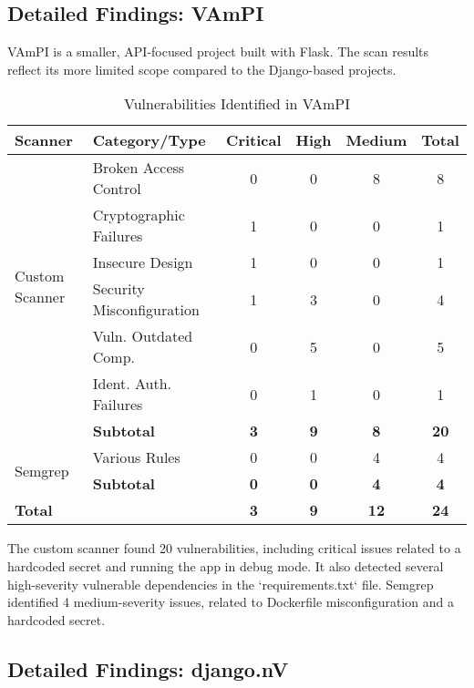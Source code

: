 \subsection{Detailed Findings: VAmPI}

VAmPI is a smaller, API-focused project built with Flask. The scan results reflect its more limited scope compared to the Django-based projects.

\begin{table}[h!]
\centering
\caption{Vulnerabilities Identified in VAmPI}
\label{tab:vampi_vulns}
\begin{tabular}{|l|l|c|c|c|c|}
\hline
\textbf{Scanner} & \textbf{Category/Type} & \textbf{Critical} & \textbf{High} & \textbf{Medium} & \textbf{Total} \\
\hline
\multirow{6}{*}{Custom Scanner} & Broken Access Control & 0 & 0 & 8 & 8 \\
& Cryptographic Failures & 1 & 0 & 0 & 1 \\
& Insecure Design & 1 & 0 & 0 & 1 \\
& Security Misconfiguration & 1 & 3 & 0 & 4 \\
& Vuln. Outdated Comp. & 0 & 5 & 0 & 5 \\
& Ident. Auth. Failures & 0 & 1 & 0 & 1 \\
\cline{2-6}
& \textbf{Subtotal} & \textbf{3} & \textbf{9} & \textbf{8} & \textbf{20} \\
\hline
\multirow{2}{*}{Semgrep} & Various Rules & 0 & 0 & 4 & 4 \\
\cline{2-6}
& \textbf{Subtotal} & \textbf{0} & \textbf{0} & \textbf{4} & \textbf{4} \\
\hline
\multicolumn{2}{|l|}{\textbf{Total}} & \textbf{3} & \textbf{9} & \textbf{12} & \textbf{24} \\
\hline
\end{tabular}
\end{table}

The custom scanner found 20 vulnerabilities, including critical issues related to a hardcoded secret and running the app in debug mode. It also detected several high-severity vulnerable dependencies in the `requirements.txt` file. Semgrep identified 4 medium-severity issues, related to Dockerfile misconfiguration and a hardcoded secret.

\subsection{Detailed Findings: django.nV}

